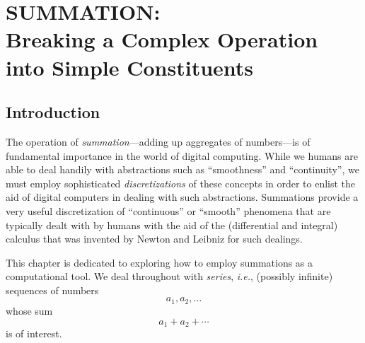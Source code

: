 
\chapter{SUMMATION: \\
Breaking a Complex Operation into Simple Constituents}
\label{ch:Summation}


\section{Introduction}
\label{sec:intro}

The operation of {\it summation}---adding up aggregates of
numbers---is of fundamental importance in the world of digital
computing.  While we humans are able to deal handily with abstractions
such as ``smoothness'' and ``continuity'', we must employ
sophisticated {\em discretizations} of these concepts in order to
enlist the aid of digital computers in dealing with such abstractions.
Summations provide a very useful discretization of ``continuous'' or
``smooth'' phenomena that are typically dealt with by humans with the
aid of the (differential and integral) calculus that was invented by
Newton and Leibniz for such dealings.

This chapter is dedicated to exploring how to employ summations as a
computational tool.  We deal throughout with {\it series}, {\it i.e.},
(possibly infinite) sequences of numbers
\[ a_1, a_2, \ldots \]
whose sum
\begin{equation}
\label{eq:abstract-sum}
a_1 + a_2 + \cdots
\end{equation}
is of interest.
\medskip

\noindent {}

